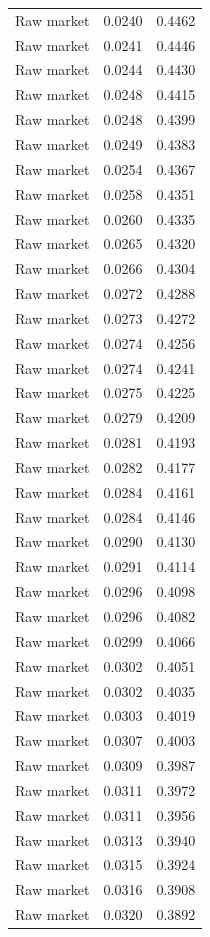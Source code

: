 \begin{table}[htbp]
\begin{tabular}{lll}
Raw market & 0.0240 & 0.4462 \\
Raw market & 0.0241 & 0.4446 \\
Raw market & 0.0244 & 0.4430 \\
Raw market & 0.0248 & 0.4415 \\
Raw market & 0.0248 & 0.4399 \\
Raw market & 0.0249 & 0.4383 \\
Raw market & 0.0254 & 0.4367 \\
Raw market & 0.0258 & 0.4351 \\
Raw market & 0.0260 & 0.4335 \\
Raw market & 0.0265 & 0.4320 \\
Raw market & 0.0266 & 0.4304 \\
Raw market & 0.0272 & 0.4288 \\
Raw market & 0.0273 & 0.4272 \\
Raw market & 0.0274 & 0.4256 \\
Raw market & 0.0274 & 0.4241 \\
Raw market & 0.0275 & 0.4225 \\
Raw market & 0.0279 & 0.4209 \\
Raw market & 0.0281 & 0.4193 \\
Raw market & 0.0282 & 0.4177 \\
Raw market & 0.0284 & 0.4161 \\
Raw market & 0.0284 & 0.4146 \\
Raw market & 0.0290 & 0.4130 \\
Raw market & 0.0291 & 0.4114 \\
Raw market & 0.0296 & 0.4098 \\
Raw market & 0.0296 & 0.4082 \\
Raw market & 0.0299 & 0.4066 \\
Raw market & 0.0302 & 0.4051 \\
Raw market & 0.0302 & 0.4035 \\
Raw market & 0.0303 & 0.4019 \\
Raw market & 0.0307 & 0.4003 \\
Raw market & 0.0309 & 0.3987 \\
Raw market & 0.0311 & 0.3972 \\
Raw market & 0.0311 & 0.3956 \\
Raw market & 0.0313 & 0.3940 \\
Raw market & 0.0315 & 0.3924 \\
Raw market & 0.0316 & 0.3908 \\
Raw market & 0.0320 & 0.3892 \\

\end{tabular}
\end{table}
